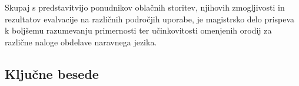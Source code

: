 Skupaj s predstavitvijo ponudnikov oblačnih storitev, njihovih zmogljivosti in rezultatov evalvacije na različnih področjih uporabe, je magistrsko delo prispeva k boljšemu razumevanju primernosti ter učinkovitosti omenjenih orodij za različne naloge obdelave naravnega jezika.

\subsection*{Ključne besede}
\textit{\tkeywords}
\clearemptydoublepage 